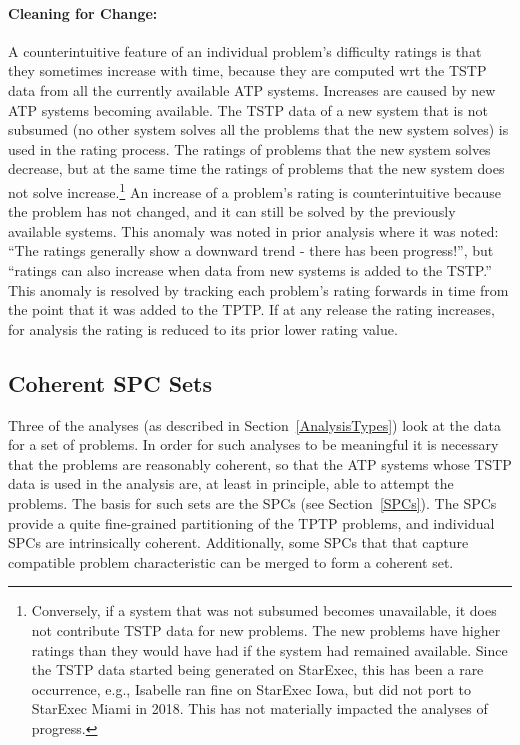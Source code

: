 \documentclass[runningheads]{llncs}
\begin{document}
\paragraph{Cleaning for Change:}
A counterintuitive feature of an individual problem's difficulty ratings is that they sometimes 
increase with time, because they are computed wrt the TSTP data from all the currently available
ATP systems.
Increases are caused by new ATP systems becoming available.
The TSTP data of a new system that is not subsumed (no other system solves all the problems 
that the new system solves) is used in the rating process.
The ratings of problems that the new system solves decrease, but at the same time the ratings of
problems that the new system does not solve increase.\footnote{%
Conversely, if a system that was not subsumed becomes unavailable, it does not contribute TSTP
data for new problems.
The new problems have higher ratings than they would have had if the system had remained
available.
Since the TSTP data started being generated on StarExec, this has been a rare occurrence, e.g.,
Isabelle ran fine on StarExec Iowa, but did not port to StarExec Miami in 2018.
This has not materially impacted the analyses of progress.}
An increase of a problem's rating is counterintuitive because the problem has not changed, and 
it can still be solved by the previously available systems.
This anomaly was noted in prior analysis \cite{Sut17} where it was noted: ``The ratings generally 
show a downward trend - there has been progress!'', but ``ratings can also increase when data 
from new systems is added to the TSTP.''
This anomaly is resolved by tracking each problem's rating forwards in time from the point 
that it was added to the TPTP.
If at any release the rating increases, for analysis the rating is reduced to its prior
lower rating value.

\subsection{Coherent SPC Sets}
\label{SPCSets}

Three of the analyses (as described in Section~\ref{AnalysisTypes}) look at the data for a set
of problems.
In order for such analyses to be meaningful it is necessary that the problems are reasonably
coherent, so that the ATP systems whose TSTP data is used in the analysis are, at least
in principle, able to attempt the problems.
The basis for such sets are the SPCs (see Section~\ref{SPCs}).
The SPCs provide a quite fine-grained partitioning of the TPTP problems, and individual SPCs
are intrinsically coherent.
Additionally, some SPCs that that capture compatible problem characteristic can be merged
to form a coherent set.
\end{document}
